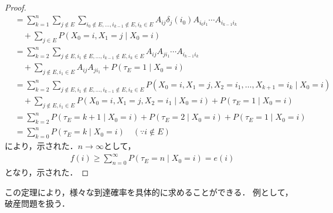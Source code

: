 \documentclass[dvipdfmx,autodetect-engine]{jsarticle}
\theoremstyle{remark}
\theoremstyle{definition}
\begin{document}
\begin{proof}
\begin{align}
            &= \sum_{k = 1}^{n} \sum_{j \notin E}  
            \sum_{i_0 \notin E,\ldots,i_{k-1} \notin E,i_{k} \in E}
            A_{ij} \delta_{j}(i_0) A_{i_0 i_1} \cdots A_{i_{k-1} i_{k}} \\
            &\quad + \sum_{j \in E} P(X_0 = i,X_1 = j \mid X_0 = i)  \\
            &=\sum_{k = 2}^{n} \sum_{j \notin E,i_1 \notin E,\ldots,i_{k-1} \notin E,i_{k} \in E}
            A_{ij}  A_{j i_1} \cdots A_{i_{k-1} i_{k}} \\
            &\quad + \sum_{j \notin E,i_1 \in E} A_{ij} A_{j i_1}
            + P(\tau_{E}=1\mid X_0 = i)  \\
            &= \sum_{k = 2}^{n} \sum_{j \notin E,i_1 \notin E,\ldots,i_{k-1} \notin E,i_{k} \in E}
            P(X_0=i,X_1=j,X_2=i_1,\ldots,X_{k+1}=i_k \mid X_0 =i) \\
            &\quad + \sum_{j \notin E,i_1 \in E} P(X_0=i,X_1=j,X_2=i_1 \mid X_0=i) 
            + P(\tau_{E}=1\mid X_0 = i)\\
            &= \sum_{k = 2}^{n} P(\tau_{E} = k+1\mid X_0 = i) 
            + P(\tau_{E} = 2 \mid X_0 = i) + P(\tau_{E}=1\mid X_0 = i)\\
            &= \sum_{k=0}^{n} P(\tau_{E} = k \mid X_0 = i) \quad (\because i \notin E)
    \end{align}
    により，示された．$n \to \infty$として，
    \begin{align}
        f(i) \geq \sum_{n=0}^{\infty} P(\tau_{E}=n \mid X_0 =i) = e(i)
    \end{align}
    となり，示された．
\end{proof}

この定理により，様々な到達確率を具体的に求めることができる．
例として，破産問題を扱う．
\end{document}
